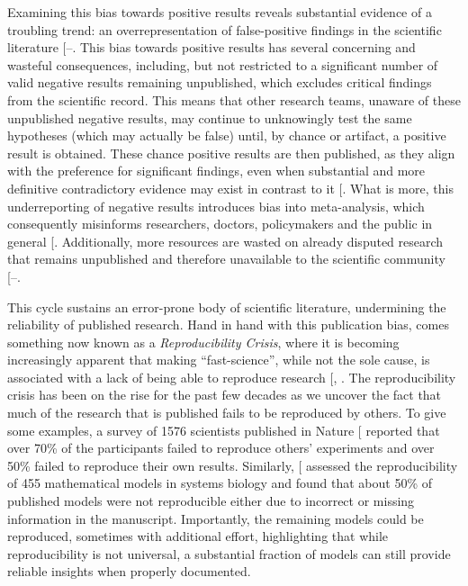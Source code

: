 \documentclass[
  11pt,
  letterpaper,
]{scrreprt}
\begin{document}
Examining this bias towards positive results reveals substantial
evidence of a troubling trend: an overrepresentation of false-positive
findings in the scientific literature
{[}--\citeproc{ref-schneck2023Are}{327}{]}.
This bias towards positive results has several concerning and wasteful
consequences, including, but not restricted to a significant number of
valid negative results remaining unpublished, which excludes critical
findings from the scientific record. This means that other research
teams, unaware of these unpublished negative results, may continue to
unknowingly test the same hypotheses (which may actually be false)
until, by chance or artifact, a positive result is obtained. These
chance positive results are then published, as they align with the
preference for significant findings, even when substantial and more
definitive contradictory evidence may exist in contrast to it
{[}\citeproc{ref-carlson2012Understanding}{328}{]}. What is more, this
underreporting of negative results introduces bias into meta-analysis,
which consequently misinforms researchers, doctors, policymakers and the
public in general {[}\citeproc{ref-afonso2024Perils}{329}{]}.
Additionally, more resources are wasted on already disputed research
that remains unpublished and therefore unavailable to the scientific
community
{[}--\citeproc{ref-page2019Assessing}{333}{]}.

This cycle sustains an error-prone body of scientific literature,
undermining the reliability of published research. Hand in hand with
this publication bias, comes something now known as a
\emph{Reproducibility Crisis}, where it is becoming increasingly
apparent that making ``fast-science'', while not the sole cause, is
associated with a lack of being able to reproduce research
{[},
\citeproc{ref-leite2021Juggling}{335}{]}. The reproducibility crisis has
been on the rise for the past few decades as we uncover the fact that
much of the research that is published fails to be reproduced by others.
To give some examples, a survey of 1576 scientists published in Nature
{[}\citeproc{ref-baker2016500ScientistsLift}{336}{]} reported that over
70\% of the participants failed to reproduce others' experiments and
over 50\% failed to reproduce their own results. Similarly,
{[}\citeproc{ref-tiwari2021ReproducibilitySystemsBiology}{337}{]}
assessed the reproducibility of 455 mathematical models in systems
biology and found that about 50\% of published models were not
reproducible either due to incorrect or missing information in the
manuscript. Importantly, the remaining models could be reproduced,
sometimes with additional effort, highlighting that while
reproducibility is not universal, a substantial fraction of models can
still provide reliable insights when properly documented.
\end{document}
